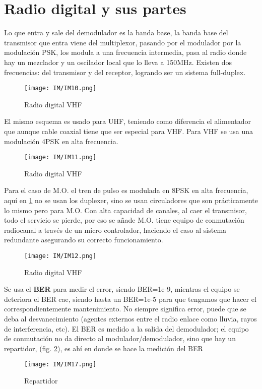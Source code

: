 \documentclass[
	12pt, %
	fleqn, %
	a4paper, %
]{LegrandOrangeBook}
\begin{document}
\section{Radio digital y sus partes}
Lo que entra y sale del demodulador es la banda base, la banda base del transmisor que entra viene del multiplexor, pasando por el modulador por la modulación PSK, los modula a una frecuencia intermedia, pasa al radio donde hay un  mezclador y un oscilador local que lo lleva a 150MHz. Existen dos frecuencias: del transmisor y del receptor, logrando ser un sistema full-duplex.
\begin{figure}[H]
\centering
\texttt{[image: IM/IM10.png]}
\caption{Radio digital VHF}
\end{figure}
El mismo esquema es usado para UHF, teniendo como diferencia el alimentador que aunque cable coaxial tiene que ser especial para VHF. Para VHF se usa una modulación 4PSK en alta frecuencia.
\begin{figure}[H]
\centering
\texttt{[image: IM/IM11.png]}
\caption{Radio digital VHF}
\end{figure}
Para el caso de M.O. el tren de pulso es modulada en 8PSK en alta frecuencia, aquí en \ref{fig:mo} no se usan los duplexer, sino se usan circuladores que son prácticamente lo mismo pero para M.O. Con alta capacidad de canales, al caer el transmisor, todo el servicio se pierde, por eso se añade M.O. tiene equipo de conmutación radiocanal a través de un micro controlador, haciendo el caso al sistema redundante asegurando su correcto funcionamiento.
\begin{figure}[H]
\centering
\texttt{[image: IM/IM12.png]}
\caption{Radio digital VHF}
\label{fig:mo}
\end{figure}
Se usa el \textbf{BER} para medir el error, siendo BER=1e-9, mientras el equipo se deteriora el BER cae, siendo hasta un BER=1e-5 para que tengamos que hacer el correspondientemente mantenimiento. No siempre significa error, puede que se deba al desvanecimiento (agentes externos entre el radio enlace como lluvia, rayos de interferencia, etc). El BER es medido a la salida del demodulador; el equipo de conmutación no da directo al modulador/demodulador, sino que hay un repartidor,  (fig. \ref{fig:repartidor}), es ahí en donde se hace la medición del BER
\begin{figure}[H]
\centering
\texttt{[image: IM/IM17.png]}
\caption{Repartidor}
\label{fig:repartidor}
\end{figure}
\end{document}
